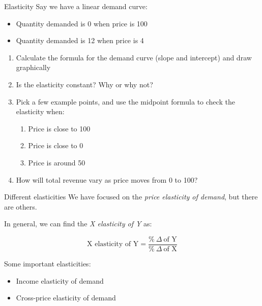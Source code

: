 \documentclass[aspectratio=169]{beamer}
\begin{document}
 \begin{frame}{Elasticity}
    Say we have a linear demand curve:
    \begin{itemize}
        \item Quantity demanded is 0 when price is 100
        \item Quantity demanded is 12 when price is 4
    \end{itemize}
    
    \medskip

    \begin{enumerate}
        \item Calculate the formula for the demand curve (slope and intercept) and draw graphically
        \item Is the elasticity constant? Why or why not?
        \item Pick a few example points, and use the midpoint formula to check the elasticity when:
            \begin{enumerate}
                \item Price is close to 100
                \item Price is close to 0
                \item Price is around 50
            \end{enumerate}
        \item How will total revenue vary as price moves from 0 to 100?
    \end{enumerate}

 \end{frame}

 \begin{frame}{Different elasticities}
    We have focused on the \textit{price elasticity of demand}, but there are others.

    \medskip

    In general, we can find the \textit{X elasticity of Y} as:

    $$
    \text{X elasticity of Y} = \dfrac{\%~\Delta~\text{of Y}}{\%~\Delta~\text{of X}}
    $$

    Some important elasticities:
    \begin{itemize}
        \item Income elasticity of demand
        \item Cross-price elasticity of demand
    \end{itemize}
 \end{frame}
\end{document}
